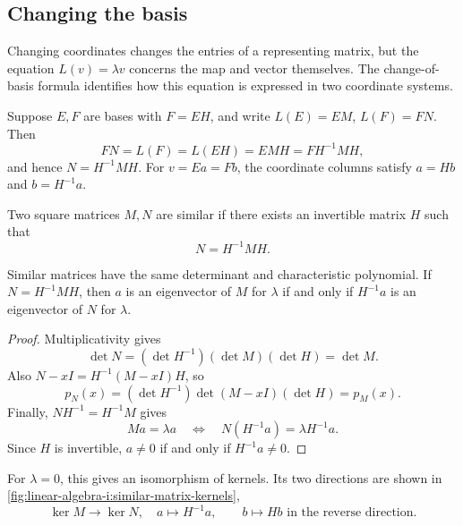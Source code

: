 \subsection{Changing the basis}

Changing coordinates changes the entries of a representing matrix, but
the equation \(L(v)=\lambda v\) concerns the map and vector themselves.
The change-of-basis formula identifies how this equation is expressed in
two coordinate systems.

Suppose \(E,F\) are bases with \(F=EH\), and write
\(L(E)=EM\), \(L(F)=FN\). Then
\[
  FN=L(F)=L(EH)=EMH=FH^{-1}MH,
\]
and hence \(N=H^{-1}MH\). For \(v=Ea=Fb\), the coordinate
columns satisfy \(a=Hb\) and \(b=H^{-1}a\).

\begin{definition}
  Two square matrices \(M,N\) are similar if there exists an invertible
  matrix \(H\) such that
  \[
    N=H^{-1}MH.
  \]
\end{definition}

\begin{proposition}
  \label{thm:linear-algebra-i:similarity-invariants}
  Similar matrices have the same determinant and characteristic polynomial.
  If \(N=H^{-1}MH\), then \(a\) is an eigenvector of \(M\) for
  \(\lambda\) if and only if \(H^{-1}a\) is an eigenvector of \(N\)
  for \(\lambda\).
\end{proposition}

\begin{proof}
  Multiplicativity gives
  \[
    \det N=(\det H^{-1})(\det M)(\det H)=\det M.
  \]
  Also \(N-xI=H^{-1}(M-xI)H\), so
  \[
    p_N(x)=(\det H^{-1})\det(M-xI)(\det H)=p_M(x).
  \]
  Finally, \(NH^{-1}=H^{-1}M\) gives
  \[
    Ma=\lambda a
    \quad\Longleftrightarrow\quad
    N(H^{-1}a)=\lambda H^{-1}a.
  \]
  Since \(H\) is invertible, \(a\ne0\) if and only if \(H^{-1}a\ne0\).
\end{proof}

For \(\lambda=0\), this gives an isomorphism of kernels. Its two directions
are shown in \autoref{fig:linear-algebra-i:similar-matrix-kernels},
\[
  \ker M\longrightarrow\ker N,\quad a\longmapsto H^{-1}a,
  \qquad b\longmapsto Hb\text{ in the reverse direction}.
\]
\begin{marginfigure}
  \centering
  
  \caption[Kernel isomorphism under similarity]{For \(N=H^{-1}MH\),
    the changes of coordinates restrict to inverse isomorphisms of kernels.}
  \label{fig:linear-algebra-i:similar-matrix-kernels}
\end{marginfigure}

